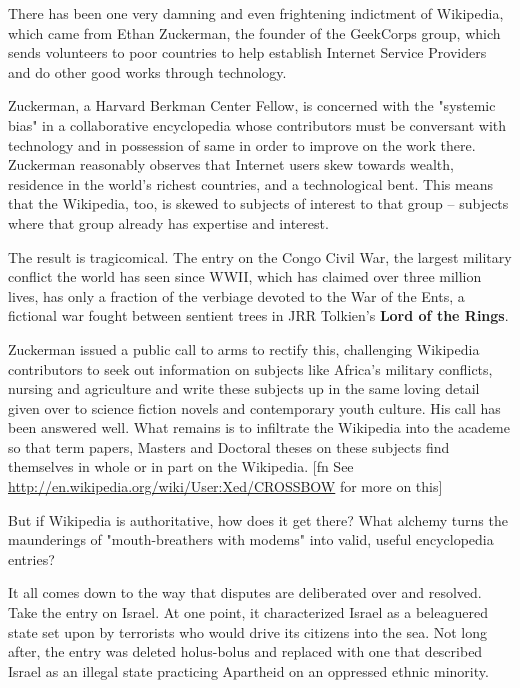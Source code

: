 There has been one very damning and even frightening indictment of
Wikipedia, which came from Ethan Zuckerman, the founder of the
GeekCorps group, which sends volunteers to poor countries to help
establish Internet Service Providers and do other good works
through technology.

Zuckerman, a Harvard Berkman Center Fellow, is concerned with the
"systemic bias" in a collaborative encyclopedia whose contributors
must be conversant with technology and in possession of same in
order to improve on the work there. Zuckerman reasonably observes
that Internet users skew towards wealth, residence in the world's
richest countries, and a technological bent. This means that the
Wikipedia, too, is skewed to subjects of interest to that group --
subjects where that group already has expertise and interest.

The result is tragicomical. The entry on the Congo Civil War, the
largest military conflict the world has seen since WWII, which has
claimed over three million lives, has only a fraction of the
verbiage devoted to the War of the Ents, a fictional war fought
between sentient trees in JRR Tolkien's
\textbf{Lord of the Rings}.

Zuckerman issued a public call to arms to rectify this, challenging
Wikipedia contributors to seek out information on subjects like
Africa's military conflicts, nursing and agriculture and write
these subjects up in the same loving detail given over to science
fiction novels and contemporary youth culture. His call has been
answered well. What remains is to infiltrate the Wikipedia into the
academe so that term papers, Masters and Doctoral theses on these
subjects find themselves in whole or in part on the Wikipedia. [fn
See
\href{http://en.wikipedia.org/wiki/User:Xed/CROSSBOW}{http://en.wikipedia.org/wiki/User:Xed/CROSSBOW}
for more on this]

But if Wikipedia is authoritative, how does it get there? What
alchemy turns the maunderings of "mouth-breathers with modems" into
valid, useful encyclopedia entries?

It all comes down to the way that disputes are deliberated over and
resolved. Take the entry on Israel. At one point, it characterized
Israel as a beleaguered state set upon by terrorists who would
drive its citizens into the sea. Not long after, the entry was
deleted holus-bolus and replaced with one that described Israel as
an illegal state practicing Apartheid on an oppressed ethnic
minority.

